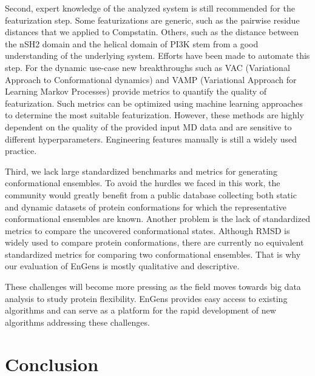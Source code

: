 \documentclass[unnumsec,webpdf,contemporary,large,numsquare]{oup-authoring-template}%
\theoremstyle{thmstyleone}%
\theoremstyle{thmstyletwo}%
\theoremstyle{thmstylethree}%
\begin{document}
Second, expert knowledge of the analyzed system is still recommended for the featurization step. Some featurizations are generic, such as the pairwise residue distances that we applied to Compstatin. Others, such as the distance between the nSH2 domain and the helical domain of PI3K stem from a good understanding of the underlying system. Efforts have been made to automate this step. For the dynamic use-case new breakthroughs such as VAC (Variational Approach to Conformational dynamics) \citep{wu_variational_2020, lorpaiboon_integrated_2020} and VAMP (Variational Approach for Learning Markov Processes) \citep{wu_variational_2020} provide metrics to quantify the quality of featurization. Such metrics can be optimized using machine learning approaches to determine the most suitable featurization. However, these methods are highly dependent on the quality of the provided input MD data and are sensitive to different hyperparameters. Engineering features manually is still a widely used practice. 

Third, we lack large standardized benchmarks and metrics for generating conformational ensembles. To avoid the hurdles we faced in this work, the community would greatly benefit from a public database collecting both static and dynamic datasets of protein conformations for which the representative conformational ensembles are known.  Another problem is the lack of standardized metrics to compare the uncovered conformational states. Although RMSD is widely used to compare protein conformations, there are currently no equivalent standardized metrics for comparing two conformational ensembles. That is why our evaluation of EnGens is mostly qualitative and descriptive. 

These challenges will become more pressing as the field moves towards big data analysis to study protein flexibility. EnGens provides easy access to existing algorithms and can serve as a platform for the rapid development of new algorithms addressing these challenges.

\section{Conclusion}
\end{document}
